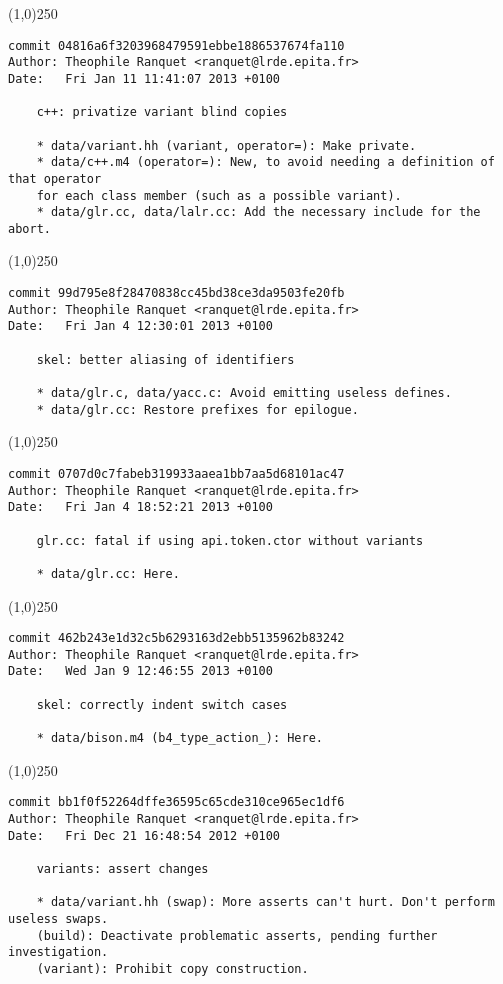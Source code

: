 \line(1,0){250}
\begin{verbatim}
commit 04816a6f3203968479591ebbe1886537674fa110
Author: Theophile Ranquet <ranquet@lrde.epita.fr>
Date:   Fri Jan 11 11:41:07 2013 +0100

    c++: privatize variant blind copies
    
    * data/variant.hh (variant, operator=): Make private.
    * data/c++.m4 (operator=): New, to avoid needing a definition of that operator
    for each class member (such as a possible variant).
    * data/glr.cc, data/lalr.cc: Add the necessary include for the abort.

\end{verbatim}
\line(1,0){250}
\begin{verbatim}
commit 99d795e8f28470838cc45bd38ce3da9503fe20fb
Author: Theophile Ranquet <ranquet@lrde.epita.fr>
Date:   Fri Jan 4 12:30:01 2013 +0100

    skel: better aliasing of identifiers
    
    * data/glr.c, data/yacc.c: Avoid emitting useless defines.
    * data/glr.cc: Restore prefixes for epilogue.

\end{verbatim}
\line(1,0){250}
\begin{verbatim}
commit 0707d0c7fabeb319933aaea1bb7aa5d68101ac47
Author: Theophile Ranquet <ranquet@lrde.epita.fr>
Date:   Fri Jan 4 18:52:21 2013 +0100

    glr.cc: fatal if using api.token.ctor without variants
    
    * data/glr.cc: Here.

\end{verbatim}
\line(1,0){250}
\begin{verbatim}
commit 462b243e1d32c5b6293163d2ebb5135962b83242
Author: Theophile Ranquet <ranquet@lrde.epita.fr>
Date:   Wed Jan 9 12:46:55 2013 +0100

    skel: correctly indent switch cases
    
    * data/bison.m4 (b4_type_action_): Here.

\end{verbatim}
\line(1,0){250}
\begin{verbatim}
commit bb1f0f52264dffe36595c65cde310ce965ec1df6
Author: Theophile Ranquet <ranquet@lrde.epita.fr>
Date:   Fri Dec 21 16:48:54 2012 +0100

    variants: assert changes
    
    * data/variant.hh (swap): More asserts can't hurt. Don't perform useless swaps.
    (build): Deactivate problematic asserts, pending further investigation.
    (variant): Prohibit copy construction.

\end{verbatim}

